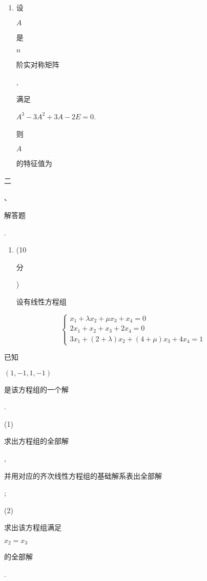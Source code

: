 \documentclass[10pt]{article}
\begin{document}
\begin{enumerate}
  \item \begin{CJK}{UTF8}{mj}设\end{CJK} $A$ \begin{CJK}{UTF8}{mj}是\end{CJK} $n$ \begin{CJK}{UTF8}{mj}阶实对称矩阵\end{CJK}, \begin{CJK}{UTF8}{mj}满足\end{CJK} $A^{3}-3 A^{2}+3 A-2 E=0$. \begin{CJK}{UTF8}{mj}则\end{CJK} $A$ \begin{CJK}{UTF8}{mj}的特征值为\end{CJK}

\end{enumerate}
\begin{CJK}{UTF8}{mj}二\end{CJK}、\begin{CJK}{UTF8}{mj}解答题\end{CJK}.

\begin{enumerate}
  \item (10 \begin{CJK}{UTF8}{mj}分\end{CJK}) \begin{CJK}{UTF8}{mj}设有线性方程组\end{CJK}
\end{enumerate}
$$
\left\{\begin{array}{l}
x_{1}+\lambda x_{2}+\mu x_{3}+x_{4}=0 \\
2 x_{1}+x_{2}+x_{3}+2 x_{4}=0 \\
3 x_{1}+(2+\lambda) x_{2}+(4+\mu) x_{3}+4 x_{4}=1
\end{array}\right.
$$
\begin{CJK}{UTF8}{mj}已知\end{CJK} $(1,-1,1,-1)$ \begin{CJK}{UTF8}{mj}是该方程组的一个解\end{CJK}.

(1) \begin{CJK}{UTF8}{mj}求出方程组的全部解\end{CJK}, \begin{CJK}{UTF8}{mj}并用对应的齐次线性方程组的基础解系表出全部解\end{CJK};

(2) \begin{CJK}{UTF8}{mj}求出该方程组满足\end{CJK} $x_{2}=x_{3}$ \begin{CJK}{UTF8}{mj}的全部解\end{CJK}.
\end{document}
